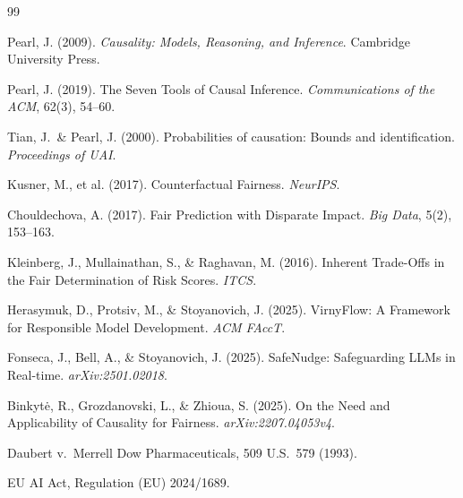 \documentclass[12pt,a4paper]{report}
\theoremstyle{plain}
\theoremstyle{definition}
\theoremstyle{remark}
\begin{document}
\begin{thebibliography}{99}

Pearl, J. (2009).
\textit{Causality: Models, Reasoning, and Inference}.
Cambridge University Press.

Pearl, J. (2019).
The Seven Tools of Causal Inference.
\textit{Communications of the ACM}, 62(3), 54--60.

Tian, J.\ \& Pearl, J. (2000).
Probabilities of causation: Bounds and identification.
\textit{Proceedings of UAI}.

Kusner, M., et al. (2017).
Counterfactual Fairness.
\textit{NeurIPS}.

Chouldechova, A. (2017).
Fair Prediction with Disparate Impact.
\textit{Big Data}, 5(2), 153--163.

Kleinberg, J., Mullainathan, S., \& Raghavan, M. (2016).
Inherent Trade-Offs in the Fair Determination of Risk Scores.
\textit{ITCS}.

Herasymuk, D., Protsiv, M., \& Stoyanovich, J. (2025).
VirnyFlow: A Framework for Responsible Model Development.
\textit{ACM FAccT}.

Fonseca, J., Bell, A., \& Stoyanovich, J. (2025).
SafeNudge: Safeguarding LLMs in Real-time.
\textit{arXiv:2501.02018}.

Binkyt\.e, R., Grozdanovski, L., \& Zhioua, S. (2025).
On the Need and Applicability of Causality for Fairness.
\textit{arXiv:2207.04053v4}.

Daubert v.\ Merrell Dow Pharmaceuticals,
509 U.S.\ 579 (1993).

EU AI Act, Regulation (EU) 2024/1689.

\end{thebibliography}
\end{document}
